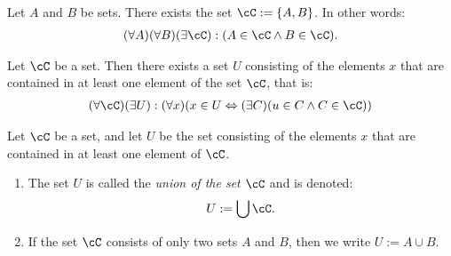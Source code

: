     \begin{axiom}
        Let $A$ and $B$ be sets. There exists the set $\cC := \{A,B\}$. In other words:
            \begin{equation*}
            \begin{split}
                (\forall A)(\forall B)(\exists \cC):(A \in \cC \land B \in \cC).
            \end{split}
            \end{equation*}
    \end{axiom}

    \begin{axiom}
        Let $\cC$ be a set. Then there exists a set $U$ consisting of the elements $x$ that are contained in at least one element of the set $\cC$, that is:
            \begin{equation*}
            \begin{split}
                (\forall \cC)(\exists U):(\forall x)(x \in U \Leftrightarrow (\exists C)(u \in C \land C \in \cC))
            \end{split}
            \end{equation*}
    \end{axiom}

    \begin{definition}
        Let $\cC$ be a set, and let $U$ be the set consisting of the elements $x$ that are contained in at least one element of $\cC$. 
        \begin{enumerate}[label = (\arabic*),itemsep=1pt,topsep=3pt]
            \item The set $U$ is called the \textit{union of the set $\cC$} and is denoted:
                \begin{equation*}
                \begin{split}
                    U := \bigcup \cC.
                \end{split}
                \end{equation*}

            \item If the set $\cC$ consists of only two sets $A$ and $B$, then we write $U:= A \cup B$.
                \begin{center}
                \end{center}
        \end{enumerate}
    \end{definition}

